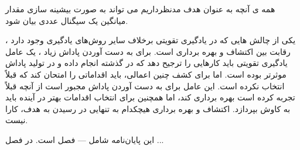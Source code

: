 همه ی آنچه به عنوان هدف مدنظرداریم می تواند به صورت بیشینه سازی مقدار میانگین یک سیگنال عددی بیان شود.



یکی از چالش هایی که در یادگیری تقویتی برخلاف سایر روش‌های یادگیری وجود دارد ، رقابت بین اکتشاف و بهره برداری است. برای به دست آوردن پاداش زیاد ، یک عامل یادگیری تقویتی باید کارهایی را ترجیح دهد که در گذشته انجام داده و در تولید پاداش موثرتر بوده است. اما برای کشف چنین اعمالی، باید اقداماتی را امتحان کند که قبلاً انتخاب نکرده است. این عامل برای به دست آوردن پاداش مجبور است از آنچه قبلاً تجربه کرده است بهره برداری کند، اما همچنین برای انتخاب اقدامات بهتر در آینده باید به کاوش بپردازد.
اکتشاف و بهره برداری هیچکدام به تنهایی در رسیدن به هدف، کارا نیست.







این پایان‌نامه شامل --- فصل است. در فصل ...
